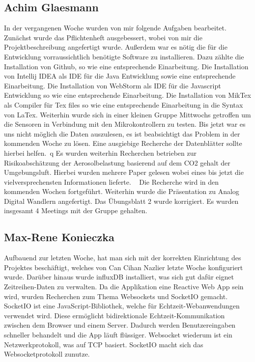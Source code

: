\documentclass[]{article}
\begin{document}
\subsection{Achim Glaesmann}
In der vergangenen Woche wurden von mir folgende Aufgaben bearbeitet. Zunächst wurde das Pflichtenheft ausgebessert, wobei von mir die Projektbeschreibung angefertigt wurde.
Außerdem war es nötig die für die Entwicklung vorraussichtlich benötigte Software zu installieren. 
Dazu zählte die Installation von Github, so wie eine entsprechende Einarbeitung. Die Installation von Intellij IDEA als IDE für die Java Entwicklung sowie eine entsprechende Einarbeitung.
Die Installation von WebStorm als IDE für die Javascript Entwicklung so wie eine entsprechende Einarbeitung. Die Installation von MikTex als Compiler für Tex files so wie eine entsprechende 
Einarbeitung in die Syntax von LaTex. Weiterhin wurde sich in einer kleinen Gruppe Mittwochs getroffen um die Sensoren in Verbindung mit den Mikrokontrollern zu testen. Bis 
jetzt war es uns nicht möglich die Daten auszulesen, es ist beabsichtigt das Problem in der kommenden Woche zu lösen. Eine ausgiebige Recherche der Datenblätter sollte hierbei
helfen.~\cite{datasheetsht21}q Es wurden weiterhin Recherchen betrieben zur Risikoabschätzung der Aerosolbelastung basierend auf dem CO2 gehalt der Umgebungsluft. Hierbei wurden mehrere Paper gelesen wobei 
eines bis jetzt die vielversprechensten Informationen lieferte. ~\cite{co2letter} Die Recherche wird in den kommenden Wochen fortgeführt. Weiterhin wurde die Präsentation zu Analog Digital Wandlern 
angefertigt. Das Übungsblatt 2 wurde korrigiert. Es wurden insgesamt 4 Meetings mit der Gruppe gehalten.

\subsection{Max-Rene Konieczka}
Aufbauend zur letzten Woche, hat man sich mit der korrekten Einrichtung des Projektes beschäftigt, welches von Can Cihan Nazlier letzte Woche konfiguriert wurde. Darüber hinaus wurde influxDB installiert, was sich gut dafür eignet Zeitreihen-Daten zu verwalten. Da die Applikation eine Reactive Web App sein wird, wurden Recherchen zum Thema Websockets und SocketIO gemacht. SocketIO ist eine JavaScript-Bibliothek, welche für Echtzeit-Webanwendungen verwendet wird. Diese ermöglicht bidirektionale Echtzeit-Kommunikation zwischen dem Browser und einem Server. Dadurch werden Benutzereingaben schneller behandelt und die App läuft flüssiger. Websocket wiederum ist ein Netzwerkprotokoll, was auf TCP basiert. SocketIO macht sich das Websocketprotokoll zunutze.
\end{document}
